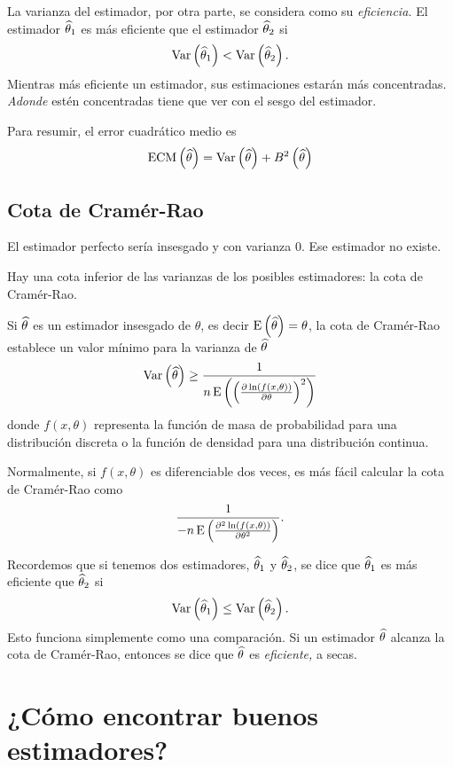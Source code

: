 La varianza del estimador, por otra parte, se considera como su \emph{eficiencia.} El estimador \(\widehat{\theta}_1\) es más eficiente que el estimador \(\widehat{\theta}_2\) si \[\operatorname{Var}\left(\widehat{\theta}_1\right)< \operatorname{Var}\left(\widehat{\theta}_2\right).\] Mientras más eficiente un estimador, sus estimaciones estarán más concentradas. \emph{Adonde} estén concentradas tiene que ver con el sesgo del estimador.

Para resumir, el error cuadrático medio es \[\operatorname{ECM}\left( \widehat{\theta} \right) = \operatorname{Var}\left(\widehat{\theta}\right) + B^2\left( \widehat{\theta} \right)\]

\subsection{Cota de Cramér-Rao}

El estimador perfecto sería insesgado y con varianza \(0\). Ese estimador no existe.

Hay una cota inferior de las varianzas de los posibles estimadores: la cota de Cramér-Rao. 
\newpage

\formal
Si \(\widehat{\theta}\) es un estimador insesgado de \(\theta\), es decir \(\operatorname{E}\left(\widehat{\theta}\right) =\nobreak \theta\), la cota de Cramér-Rao establece un valor mínimo para la varianza de \(\widehat{\theta}\) \[\operatorname{Var}\left(\widehat{\theta}\right) \geq \frac{1}{n\operatorname{E}\left(\left( \frac{\partial \ln\left(f(x, \theta)\right)}{\partial \theta} \right)^2\right)}\] donde \(f(x, \theta)\) representa la función de masa de probabilidad para una distribución discreta o la función de densidad para una distribución continua. 

Normalmente, si \(f(x, \theta)\) es diferenciable dos veces, es más fácil calcular la cota de Cramér-Rao como \[\frac{1}{-n\operatorname{E}\left(\frac{\partial^2 \ln\left( f(x, \theta) \right)}{\partial \theta^2}\right)}.\]

\informal
Recordemos que si tenemos dos estimadores, \(\widehat{\theta}_1\) y \(\widehat{\theta}_2\), se dice que \(\widehat{\theta}_1\) es más eficiente que \(\widehat{\theta}_2\) si \[\operatorname{Var}\left(\widehat{\theta}_1\right) \leq \operatorname{Var}\left(\widehat{\theta}_2\right).\] Esto funciona simplemente como una comparación. Si un estimador \(\widehat{\theta}\) alcanza la cota de Cramér-Rao, entonces se dice que \(\widehat{\theta}\) es \emph{eficiente,} a secas.

\section{¿Cómo encontrar buenos estimadores?}

